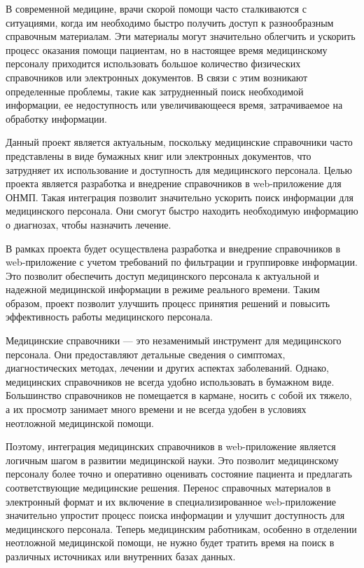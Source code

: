 \introduction %

В современной медицине, врачи скорой помощи часто сталкиваются с ситуациями, когда им необходимо быстро получить доступ к разнообразным справочным материалам. Эти материалы могут значительно облегчить и ускорить процесс оказания помощи пациентам, но в настоящее время медицинскому персоналу приходится использовать большое количество физических справочников или электронных документов. В связи с этим возникают определенные проблемы, такие как затрудненный поиск необходимой информации, ее недоступность или увеличивающееся время, затрачиваемое на обработку информации.

Данный проект является актуальным, поскольку медицинские справочники часто представлены в виде бумажных книг или электронных документов, что затрудняет их использование и доступность для медицинского персонала. Целью проекта является разработка и внедрение справочников в web-приложение для ОНМП. Такая интеграция позволит значительно ускорить поиск информации для медицинского персонала. Они смогут быстро находить необходимую информацию о диагнозах, чтобы назначить лечение.

В рамках проекта будет осуществлена разработка и внедрение справочников в web-приложение с учетом требований по фильтрации и группировке информации. Это позволит обеспечить доступ медицинского персонала к актуальной и надежной медицинской информации в режиме реального времени. Таким образом, проект позволит улучшить процесс принятия решений и повысить эффективность работы медицинского персонала.

Медицинские справочники — это незаменимый инструмент для медицинского персонала. Они предоставляют детальные сведения о симптомах, диагностических методах, лечении и других аспектах заболеваний. Однако, медицинских справочников не всегда удобно использовать в бумажном виде. Большинство справочников не помещается в кармане, носить с собой их тяжело, а их просмотр занимает много времени и не всегда удобен в условиях неотложной медицинской помощи.

Поэтому, интеграция медицинских справочников в web-приложение является логичным шагом в развитии медицинской науки. Это позволит медицинскому персоналу более точно и оперативно оценивать состояние пациента и предлагать соответствующие медицинские решения. Перенос справочных материалов в электронный формат и их включение в специализированное web-приложение значительно упростит процесс поиска информации и улучшит доступность для медицинского персонала. Теперь медицинским работникам, особенно в отделении неотложной медицинской помощи, не нужно будет тратить время на поиск в различных источниках или внутренних базах данных.

